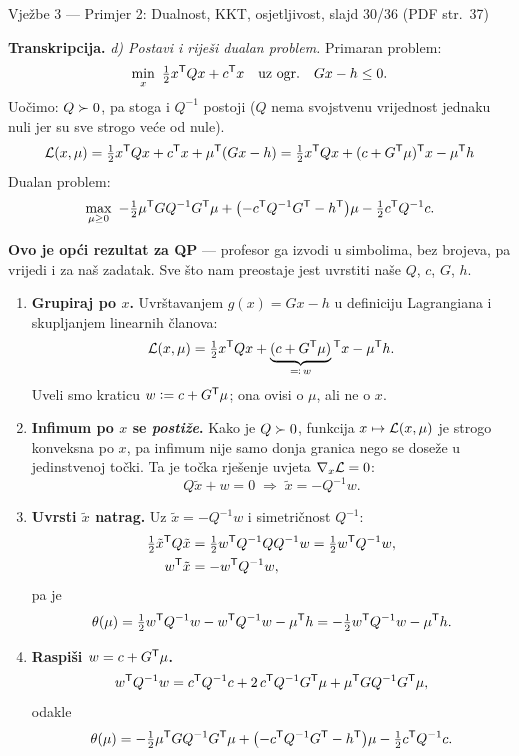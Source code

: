 \begin{izvor}{Vježbe 3 --- Primjer 2: Dualnost, KKT, osjetljivost, slajd 30/36 (PDF str.~37)}

\textbf{Transkripcija.} \emph{d) Postavi i riješi dualan problem.} Primaran
problem:
\[
\min_x \ \tfrac12 x\trans Qx + c\trans x \quad \text{uz ogr.} \quad Gx - h \leq 0 .
\]
Uočimo: $Q \succ 0$, pa stoga i $Q^{-1}$ postoji ($Q$ nema svojstvenu vrijednost
jednaku nuli jer su sve strogo veće od nule).
\[
\mathcal{L}(x,\mu) = \tfrac12 x^{\mathsf{T}} Qx + c^{\mathsf{T}} x + \mu^{\mathsf{T}}(Gx - h)
            = \tfrac12 x^{\mathsf{T}} Qx + (c + G^{\mathsf{T}}\mu)^{\mathsf{T}} x - \mu^{\mathsf{T}} h
\]
Dualan problem:
\[
\max_{\mu \geq 0} \ -\tfrac12 \mu^{\mathsf{T}} G Q^{-1} G^{\mathsf{T}} \mu
+ \bigl(-c^{\mathsf{T}} Q^{-1}G^{\mathsf{T}} - h^{\mathsf{T}}\bigr)\mu - \tfrac12 c^{\mathsf{T}} Q^{-1} c .
\]

\textbf{Ovo je opći rezultat za QP} --- profesor ga izvodi u simbolima, bez
brojeva, pa vrijedi i za naš zadatak. Sve što nam preostaje jest uvrstiti naše
$Q$, $c$, $G$, $h$.
\end{izvor}

\begin{korak}
\begin{enumerate}[leftmargin=*]
  \item \textbf{Grupiraj po $x$.} Uvrštavanjem $g(x) = Gx - h$ u definiciju
        Lagrangiana i skupljanjem linearnih članova:
        \[
          \mathcal{L}(x,\mu) = \tfrac12 x^{\mathsf{T}} Q x + \underbrace{(c + G^{\mathsf{T}}\mu)}_{\eqqcolon\, w}{}^{\mathsf{T}} x - \mu^{\mathsf{T}} h .
        \]
        Uveli smo kraticu $w \mathrel{\vcentcolon=} c + G^{\mathsf{T}}\mu$; ona ovisi o $\mu$, ali ne o $x$.
  \item \textbf{Infimum po $x$ se \emph{postiže}.} Kako je $Q \succ 0$, funkcija
        $x \mapsto \mathcal{L}(x,\mu)$ je strogo konveksna po $x$, pa infimum nije samo
        donja granica nego se doseže u jedinstvenoj točki. Ta je točka rješenje
        uvjeta $\nabla_x \mathcal{L} = 0$:
        \[
          Q\tilde{x} + w = 0 \;\Longrightarrow\; \tilde{x} = -Q^{-1}w .
        \]
  \item \textbf{Uvrsti $\tilde{x}$ natrag.} Uz $\tilde{x} = -Q^{-1}w$ i
        simetričnost $Q^{-1}$:
        \begin{align*}
          \tfrac12 \tilde{x}^{\mathsf{T}} Q \tilde{x}
            &= \tfrac12 w^{\mathsf{T}} Q^{-1} Q Q^{-1} w = \tfrac12 w^{\mathsf{T}} Q^{-1} w, \\
          w^{\mathsf{T}} \tilde{x} &= -w^{\mathsf{T}} Q^{-1} w,
        \end{align*}
        pa je
        \[
          \theta(\mu) = \tfrac12 w^{\mathsf{T}} Q^{-1}w - w^{\mathsf{T}} Q^{-1}w - \mu^{\mathsf{T}} h
                     = -\tfrac12 w^{\mathsf{T}} Q^{-1}w - \mu^{\mathsf{T}} h .
        \]
  \item \textbf{Raspiši $w = c + G^{\mathsf{T}}\mu$.}
        \[
          w^{\mathsf{T}} Q^{-1} w = c^{\mathsf{T}} Q^{-1}c + 2\,c^{\mathsf{T}} Q^{-1}G^{\mathsf{T}}\mu + \mu^{\mathsf{T}} G Q^{-1}G^{\mathsf{T}} \mu ,
        \]
        odakle
        \[
          \theta(\mu) = -\tfrac12 \mu^{\mathsf{T}} G Q^{-1}G^{\mathsf{T}}\mu
                       + \bigl(-c^{\mathsf{T}} Q^{-1}G^{\mathsf{T}} - h^{\mathsf{T}}\bigr)\mu
                       - \tfrac12 c^{\mathsf{T}} Q^{-1}c .
        \]
\end{enumerate}
\end{korak}

